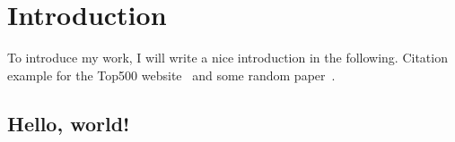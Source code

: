 \chapter{Introduction}
\label{chapter:introduction}

To introduce my work, I will write a nice introduction in the following.
Citation example for the Top500 website~\cite{top500} and some random paper~\cite{graham1969}.

\section{Hello, world!}
\lipsum[1-5]
